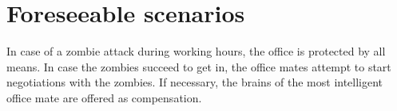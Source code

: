 \section{Foreseeable scenarios}
\begin{clause}
In case of a zombie attack during working hours, the office is protected by all means. In case the zombies succeed to get in, the office mates attempt to start negotiations with the zombies. If necessary, the brains of the most intelligent office mate are offered as compensation.
\end{clause}